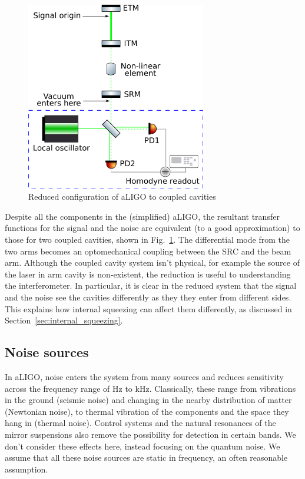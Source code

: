 \documentclass[aps,pra,superscriptaddress,reprint,nofootinbib]{revtex4-1}
\begin{document}
\begin{figure}
	\begin{center}
	\includegraphics[width=0.7\textwidth]{figures/aLIGO_as_coupled_cavities.pdf}
	\end{center}
	\caption{Reduced configuration of aLIGO to coupled cavities}
	\label{fig:aLIGO_as_coupled_cavities}
\end{figure}

Despite all the components in the (simplified) aLIGO, the resultant transfer functions for the signal and the noise are equivalent (to a good approximation) to those for two coupled cavities, shown in Fig.~\ref{fig:aLIGO_as_coupled_cavities}. The differential mode from the two arms becomes an optomechanical coupling between the SRC and the beam arm.
Although the coupled cavity system isn’t physical, for example the source of the laser in arm cavity is non-existent, the reduction is useful to understanding the interferometer. In particular, it is clear in the reduced system that the signal and the noise see the cavities differently as they they enter from different sides. This explains how internal squeezing can affect them differently, as discussed in Section~\ref{sec:internal_squeezing}.


\subsection{Noise sources}
\label{sec:noise_sources}

In aLIGO, noise enters the system from many sources and reduces sensitivity across the frequency range of Hz to kHz. Classically, these range from vibrations in the ground (seismic noise) and changing in the nearby distribution of matter (Newtonian noise), to thermal vibration of the components and the space they hang in (thermal noise). Control systems and the natural resonances of the mirror suspensions also remove the possibility for detection in certain bands. We don’t consider these effects here, instead focusing on the quantum noise. We assume that all these noise sources are static in frequency, an often reasonable assumption. 
\end{document}
